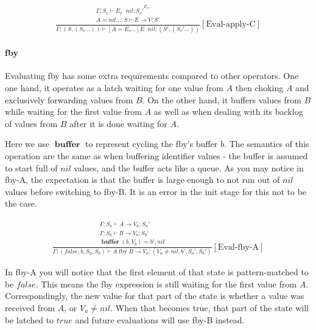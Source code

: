 \documentclass{scrartcl}
\DeclareMathOperator{\fby}{fby}
\DeclareMathOperator{\ceval}{\overset{C}{\rightarrow}}
\DeclareMathOperator{\buffer}{\mathbf{buffer}}
\begin{document}
    \begin{align*}
    \frac{
        \begin{matrix}
        \overline{\Gamma; S_v \vdash E_v \ceval nil; S_v'}^{E_v...} \\
        A = nil...; S \vdash E \rightarrow V; S'
        \end{matrix}
    }{
        \Gamma; (S, (S_v...)) \vdash [A=E_v...]E \ceval nil; (S', (S_v'...))
    }[\text{Eval-apply-C}]
    \end{align*}
    
    \paragraph{fby}
    
    Evaluating fby has some extra requirements compared to other operators. One one hand, it operates as a latch waiting for one value from $A$ then choking $A$ and exclusively forwarding values from $B$. On the other hand, it buffers values from $B$ while waiting for the first value from $A$ as well as when dealing with its backlog of values from $B$ after it is done waiting for $A$.
    
    Here we use $\buffer$ to represent cycling the fby's buffer $b$. The semantics of this operation are the same as when buffering identifier values - the buffer is assumed to start full of $nil$ values, and the buffer acts like a queue. As you may notice in fby-A, the expectation is that the buffer is large enough to not run out of $nil$ values before switching to fby-B. It is an error in the init stage for this not to be the case.
    
    \begin{align*}
    \frac{
        \begin{matrix}
        \Gamma; S_a \vdash A \rightarrow V_a; S_a' \\
        \Gamma; S_b \vdash B \rightarrow V_b; S_b' \\
        \buffer(b, V_b) = b', nil
        \end{matrix}
    }{
        \Gamma; (false, b, S_a, S_b) \vdash A \fby B \rightarrow V_a; (V_a \neq nil, b', S_a', S_b')
    }[\text{Eval-fby-A}]
    \end{align*}
    
    In fby-A you will notice that the first element of that state is pattern-matched to be $false$. This means the fby expression is still waiting for the first value from $A$. Correspondingly, the new value for that part of the state is whether a value was received from $A$, or $V_a \neq nil$. When that becomes true, that part of the state will be latched to $true$ and future evaluations will use fby-B instead.
    
\end{document}
